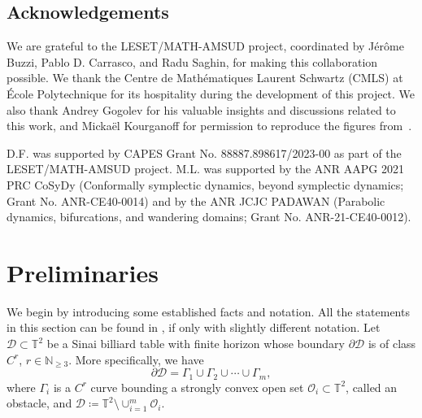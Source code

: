 \documentclass[reqno,11pt]{amsart}
\begin{document}
\subsection*{Acknowledgements}
We are grateful to the LESET/MATH-AMSUD project, coordinated by Jérôme Buzzi, Pablo D. Carrasco, and Radu Saghin, for making this collaboration possible. 
We thank the Centre de Mathématiques Laurent Schwartz (CMLS) at École Polytechnique for its hospitality during the development of this project. 
We also thank Andrey Gogolev for his valuable insights and discussions related to this work, and Mickaël Kourganoff for permission to reproduce the figures from~\cite{kourganoff_anosov_2016}. 

D.F. was supported by CAPES Grant No. 88887.898617/2023-00 as part of the LESET/MATH-AMSUD project. 
M.L. was supported by the ANR AAPG 2021 PRC CoSyDy (Conformally symplectic dynamics, beyond symplectic dynamics; Grant No. ANR-CE40-0014) and by the ANR JCJC PADAWAN (Parabolic dynamics, bifurcations, and wandering domains; Grant No. ANR-21-CE40-0012). 

\section{Preliminaries}\label{sec_symbolics_prelim}
\par We begin by introducing some established facts and notation.
All the statements in this section can be found in \cite{chernov_chaotic_2006}, if only with slightly different notation. 
Let \( \mathcal{D}\subset \mathbb{T}^2 \) be a Sinai billiard table with finite horizon whose boundary \( \partial \mathcal{D} \) is of class \( C^r \),  \( r \in \mathbb{N}_{\geq 3}\).
More specifically, we have 
\[
    \partial\mathcal{D} = \Gamma_1 \cup \Gamma_2 \cup \cdots \cup \Gamma_m,
\]    
where \( \Gamma_i \) is a $C^r$ curve bounding a strongly convex open set \( \mathcal{O}_i \subset \mathbb{T}^2 \), called an obstacle, and \( \mathcal{D} \coloneqq \mathbb{T}^2\setminus \cup_{i=1}^m \mathcal{O}_i \).
\end{document}
